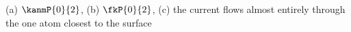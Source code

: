 (a) $\kanmP{0}{2}$, (b) $\fkP{0}{2}$, (c) the current flows almost entirely through the one atom closest to the surface
